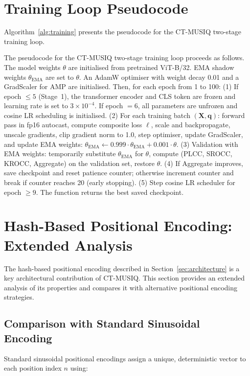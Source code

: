 \section{Training Loop Pseudocode}
\label{app:pseudocode}

Algorithm~\ref{alg:training} presents the pseudocode for the CT-MUSIQ two-stage
training loop.

The pseudocode for the CT-MUSIQ two-stage training loop proceeds as follows. The model
weights $\theta$ are initialised from pretrained ViT-B/32. EMA shadow weights
$\theta_{\text{EMA}}$ are set to $\theta$. An AdamW optimiser with weight decay 0.01
and a GradScaler for AMP are initialised. Then, for each epoch from 1 to 100:
(1) If epoch $\leq 5$ (Stage~1), the transformer encoder and CLS token are frozen and
learning rate is set to $3 \times 10^{-4}$. If epoch $= 6$, all parameters are
unfrozen and cosine LR scheduling is initialised.
(2) For each training batch $(\mathbf{X}, \mathbf{q})$: forward pass in fp16 autocast,
compute composite loss $\ell$, scale and backpropagate, unscale gradients, clip gradient
norm to 1.0, step optimiser, update GradScaler, and update EMA weights:
$\theta_{\text{EMA}} \leftarrow 0.999 \cdot \theta_{\text{EMA}} + 0.001 \cdot \theta$.
(3) Validation with EMA weights: temporarily substitute $\theta_{\text{EMA}}$ for $\theta$,
compute (PLCC, SROCC, KROCC, Aggregate) on the validation set, restore $\theta$.
(4) If Aggregate improves, save checkpoint and reset patience counter; otherwise increment
counter and break if counter reaches 20 (early stopping).
(5) Step cosine LR scheduler for epoch $\geq 9$.
The function returns the best saved checkpoint.

\section{Hash-Based Positional Encoding: Extended Analysis}
\label{app:hash_pos}

The hash-based positional encoding described in Section~\ref{sec:architecture} is a
key architectural contribution of CT-MUSIQ. This section provides an extended analysis
of its properties and compares it with alternative positional encoding strategies.

\subsection{Comparison with Standard Sinusoidal Encoding}

Standard sinusoidal positional encodings assign a unique, deterministic vector to each
position index $n$ using:


